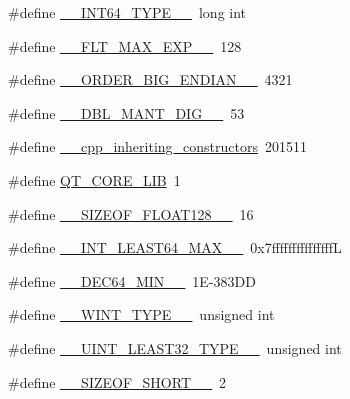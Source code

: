 \begin{DoxyCompactItemize}
\#define \hyperlink{cmake-build-debug_2babel__client__autogen_2moc__predefs_8h_a690dd4c0c7711687e30418f5e988d842}{\+\_\+\+\_\+\+I\+N\+T64\+\_\+\+T\+Y\+P\+E\+\_\+\+\_\+}~long int
\item 
\#define \hyperlink{cmake-build-debug_2babel__client__autogen_2moc__predefs_8h_abd1effb8f681ce210223aceb08d8ed33}{\+\_\+\+\_\+\+F\+L\+T\+\_\+\+M\+A\+X\+\_\+\+E\+X\+P\+\_\+\+\_\+}~128
\item 
\#define \hyperlink{cmake-build-debug_2babel__client__autogen_2moc__predefs_8h_a190d0219caabccc0e05909f39bcb00d6}{\+\_\+\+\_\+\+O\+R\+D\+E\+R\+\_\+\+B\+I\+G\+\_\+\+E\+N\+D\+I\+A\+N\+\_\+\+\_\+}~4321
\item 
\#define \hyperlink{cmake-build-debug_2babel__client__autogen_2moc__predefs_8h_ae8f0035094061d550323c738b8d67601}{\+\_\+\+\_\+\+D\+B\+L\+\_\+\+M\+A\+N\+T\+\_\+\+D\+I\+G\+\_\+\+\_\+}~53
\item 
\#define \hyperlink{cmake-build-debug_2babel__client__autogen_2moc__predefs_8h_a42c04530cde3529000b65eab84d6ef6b}{\+\_\+\+\_\+cpp\+\_\+inheriting\+\_\+constructors}~201511
\item 
\#define \hyperlink{cmake-build-debug_2babel__client__autogen_2moc__predefs_8h_a3fdaeff4a929898125f060b951479a85}{Q\+T\+\_\+\+C\+O\+R\+E\+\_\+\+L\+IB}~1
\item 
\#define \hyperlink{cmake-build-debug_2babel__client__autogen_2moc__predefs_8h_a1e2f16909b04d907f56bcc56b288b17c}{\+\_\+\+\_\+\+S\+I\+Z\+E\+O\+F\+\_\+\+F\+L\+O\+A\+T128\+\_\+\+\_\+}~16
\item 
\#define \hyperlink{cmake-build-debug_2babel__client__autogen_2moc__predefs_8h_ac8ff7f5492853e7e2fa19ebb2b98c9bc}{\+\_\+\+\_\+\+I\+N\+T\+\_\+\+L\+E\+A\+S\+T64\+\_\+\+M\+A\+X\+\_\+\+\_\+}~0x7fffffffffffffffL
\item 
\#define \hyperlink{cmake-build-debug_2babel__client__autogen_2moc__predefs_8h_abd66733cff0ce1656bb7e744aa151bea}{\+\_\+\+\_\+\+D\+E\+C64\+\_\+\+M\+I\+N\+\_\+\+\_\+}~1\+E-\/383\+DD
\item 
\#define \hyperlink{cmake-build-debug_2babel__client__autogen_2moc__predefs_8h_a1304d54dba90274495e0b09c9820927b}{\+\_\+\+\_\+\+W\+I\+N\+T\+\_\+\+T\+Y\+P\+E\+\_\+\+\_\+}~unsigned int
\item 
\#define \hyperlink{cmake-build-debug_2babel__client__autogen_2moc__predefs_8h_a76363f8817bf3df4542ebbcce172df53}{\+\_\+\+\_\+\+U\+I\+N\+T\+\_\+\+L\+E\+A\+S\+T32\+\_\+\+T\+Y\+P\+E\+\_\+\+\_\+}~unsigned int
\item 
\#define \hyperlink{cmake-build-debug_2babel__client__autogen_2moc__predefs_8h_ae9ea889821e3c2486a7435a83a309e80}{\+\_\+\+\_\+\+S\+I\+Z\+E\+O\+F\+\_\+\+S\+H\+O\+R\+T\+\_\+\+\_\+}~2

\end{DoxyCompactItemize}
